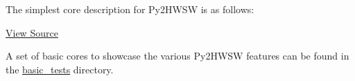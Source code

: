 %

The simplest core description for Py2HWSW is as follows:


\href{https://github.com/IObundle/py2hwsw/blob/main/py2hwsw/lib/hardware/basic_tests/iob_and/iob_and.py}{View Source}

A set of basic cores to showcase the various Py2HWSW features can be found in
the \href{https://github.com/IObundle/py2hwsw/tree/main/py2hwsw/lib/hardware/basic_tests}{basic\_tests}
directory.
